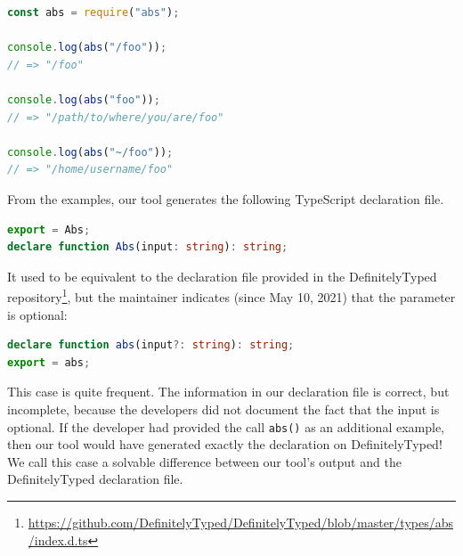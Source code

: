 \documentclass[sigconf]{acmart}
\begin{document}
\begin{lstlisting}[language=JavaScript,numbers=none]
const abs = require("abs");
 
console.log(abs("/foo"));
// => "/foo"
 
console.log(abs("foo"));
// => "/path/to/where/you/are/foo"
 
console.log(abs("~/foo"));
// => "/home/username/foo"
\end{lstlisting}
From the examples, our tool generates the following TypeScript declaration file.
\begin{lstlisting}[language=TypeScript,numbers=none]
export = Abs;
declare function Abs(input: string): string;
\end{lstlisting}
It used to be equivalent to the declaration file provided in the
DefinitelyTyped
repository\footnote{\url{https://github.com/DefinitelyTyped/DefinitelyTyped/blob/master/types/abs/index.d.ts}},
but the maintainer indicates (since May 10, 2021) that the parameter is optional:
\begin{lstlisting}[language=TypeScript,numbers=none]
declare function abs(input?: string): string;
export = abs;
\end{lstlisting}
This case is quite frequent. The information in our declaration file is
correct, but incomplete, because the developers did not document the
fact that the input is optional. If the developer had provided the
call  \lstinline/abs()/ as an additional 
example, then our tool would have generated exactly
the declaration on DefinitelyTyped! We call this case a solvable
difference between our tool's output and the DefinitelyTyped
declaration file.

\end{document}
